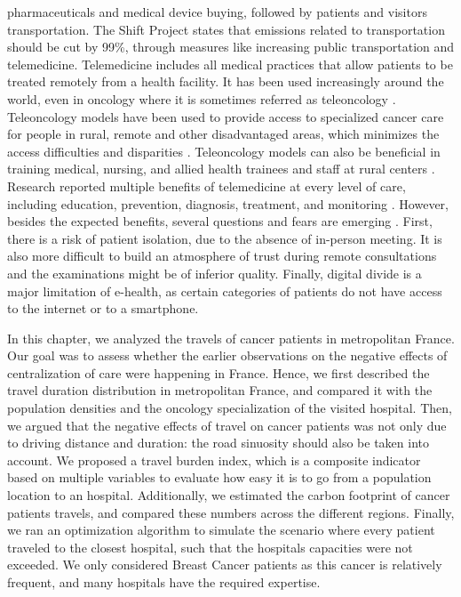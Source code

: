pharmaceuticals and medical device buying, followed by patients and visitors
transportation. The Shift Project states that emissions related to
transportation should be cut by 99\%, through measures like increasing public
transportation and telemedicine. Telemedicine includes all medical practices that
allow patients to be treated remotely from a health facility. It has been used
increasingly around the world, even in oncology where it is sometimes referred
as teleoncology
\cite{mooi_teleoncology_2012,sabesan_are_2014,sabesan_timely_2014,sabesan_medical_2014}.
Teleoncology models have been used to provide access to specialized cancer care
for people in rural, remote and other disadvantaged areas, which minimizes the
access difficulties and disparities \cite{sabesan_telemedicine_2012,
    sabesan_are_2014}. Teleoncology models can also be beneficial in training
medical, nursing, and allied health trainees and staff at rural centers
\cite{sabesan_medical_2014}. Research reported multiple benefits of telemedicine
at every level of care, including education, prevention, diagnosis, treatment,
and monitoring \cite{bertucci_outpatient_2019}. However, besides the expected
benefits, several questions and fears are emerging
\cite{bertucci_outpatient_2019}. First, there is a risk of patient isolation,
due to the absence of in-person meeting. It is also more difficult to build an
atmosphere of trust during remote consultations and the examinations might be of
inferior quality. Finally, digital divide is a major limitation of e-health, as
certain categories of patients do not have access to the internet or to a
smartphone.

In this chapter, we analyzed the travels of cancer patients in metropolitan
France. Our goal was to assess whether the earlier observations on the negative
effects of centralization of care were happening in France. Hence, we first
described the travel duration distribution in metropolitan France, and compared
it with the population densities and the oncology specialization of the visited
hospital. Then, we argued that the negative effects of travel on cancer patients
was not only due to driving distance and duration: the road sinuosity should
also be taken into account. We proposed a travel burden index, which is a
composite indicator based on multiple variables to evaluate how easy it is to go
from a population location to an hospital. Additionally, we estimated the carbon
footprint of cancer patients travels, and compared these numbers across the
different regions. Finally, we ran an optimization algorithm to simulate the
scenario where every patient traveled to the closest hospital, such that the
hospitals capacities were not exceeded. We only considered Breast Cancer
patients as this cancer is relatively frequent, and many hospitals have the
required expertise.

